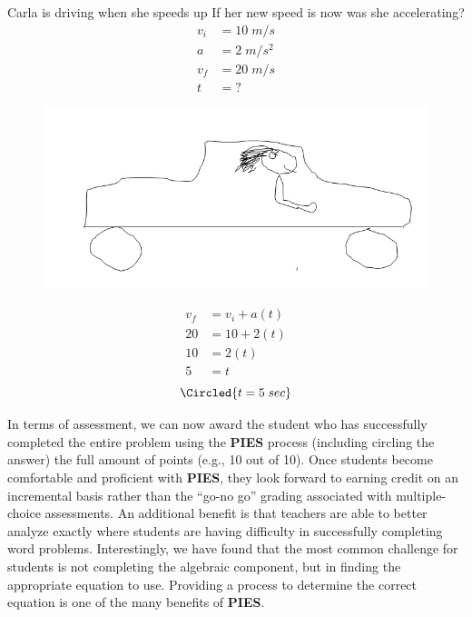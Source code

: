 \documentclass[11.5pt]{sig-alternate} %
\begin{document}
\begin{large}
Carla is driving  when she speeds up  If her new speed is now   was she accelerating?
\begin{align*}
    v_{i} &= 10\;m/s \\
    a &= 2\;m/s^{2} \\
    v_{f} &= 20\;m/s \\
    t &= ?
\end{align*}
\begin{figure}[!h]
    \centering
    \includegraphics[width=1\linewidth]{img1.jpg}
\end{figure}
\begin{align*}
    v_{f} &= v_{i} + a (t) \\
    20 &= 10 + 2 (t) \\
    10 &= 2 (t) \\
    5 &= t
\end{align*}
\[\Circled{t = 5\;sec}\]

In terms of assessment, we can now award the student who has successfully completed the entire problem using the \textbf{PIES} process (including circling the answer) the full amount of points (e.g., 10 out of 10).  Once students become comfortable and proficient with \textbf{PIES}, they look forward to earning credit on an incremental basis rather than the “go-no go” grading associated with multiple-choice assessments. An additional benefit is that teachers are able to better analyze exactly where students are having difficulty in successfully completing word problems. Interestingly, we have found that the most common challenge for students is not completing the algebraic component, but in finding the appropriate equation to use.  Providing a process to determine the correct equation is one of the many benefits of \textbf{PIES}.


\end{large}
\end{document}
